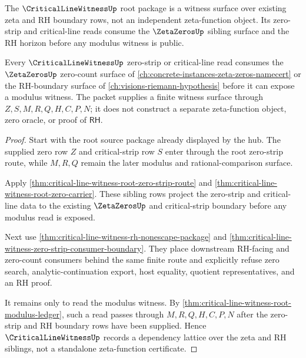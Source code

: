 The $\CriticalLineWitnessUp$ root package is a witness surface over existing zeta and RH boundary rows, not an independent zeta-function object. Its zero-strip and critical-line reads consume the $\ZetaZerosUp$ sibling surface and the RH horizon before any modulus witness is public.

\begin{theorem}
\label{thm:critical-line-witness-zeta-link}
Every $\CriticalLineWitnessUp$ zero-strip or critical-line read consumes the $\ZetaZerosUp$ zero-count surface of \autoref{ch:concrete-instances-zeta-zeros-namecert} or the RH-boundary surface of \autoref{ch:visions-riemann-hypothesis} before it can expose a modulus witness. The packet supplies a finite witness surface through $Z,S,M,R,Q,H,C,P,N$; it does not construct a separate zeta-function object, zero oracle, or proof of $\mathsf{RH}$.
\end{theorem}
\begin{proof}
Start with the root source package already displayed by the hub. The supplied zero row $Z$ and critical-strip row $S$ enter through the root zero-strip route, while $M,R,Q$ remain the later modulus and rational-comparison surface.

Apply \autoref{thm:critical-line-witness-root-zero-strip-route} and \autoref{thm:critical-line-witness-root-zero-carrier}. These sibling rows project the zero-strip and critical-line data to the existing $\ZetaZerosUp$ and critical-strip boundary before any modulus read is exposed.

Next use \autoref{thm:critical-line-witness-rh-nonescape-package} and \autoref{thm:critical-line-witness-zero-strip-consumer-boundary}. They place downstream RH-facing and zero-count consumers behind the same finite route and explicitly refuse zero search, analytic-continuation export, host equality, quotient representatives, and an RH proof.

It remains only to read the modulus witness. By \autoref{thm:critical-line-witness-root-modulus-ledger}, such a read passes through $M,R,Q,H,C,P,N$ after the zero-strip and RH boundary rows have been supplied. Hence $\CriticalLineWitnessUp$ records a dependency lattice over the zeta and RH siblings, not a standalone zeta-function certificate.
\end{proof}
